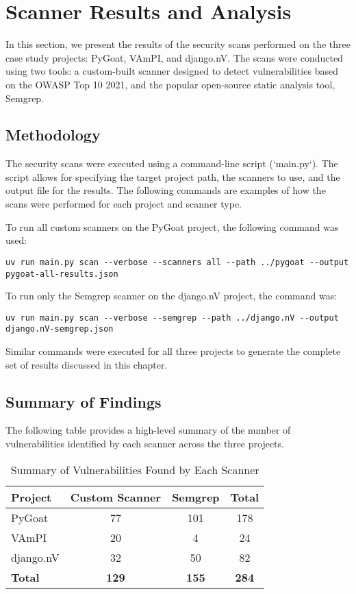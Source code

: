 
\section{Scanner Results and Analysis}
In this section, we present the results of the security scans performed on the three case study projects: PyGoat, VAmPI, and django.nV. The scans were conducted using two tools: a custom-built scanner designed to detect vulnerabilities based on the OWASP Top 10 2021, and the popular open-source static analysis tool, Semgrep.

\subsection{Methodology}

The security scans were executed using a command-line script (`main.py`). The script allows for specifying the target project path, the scanners to use, and the output file for the results. The following commands are examples of how the scans were performed for each project and scanner type.

To run all custom scanners on the PyGoat project, the following command was used:
\begin{verbatim}
uv run main.py scan --verbose --scanners all --path ../pygoat --output pygoat-all-results.json
\end{verbatim}

To run only the Semgrep scanner on the django.nV project, the command was:
\begin{verbatim}
uv run main.py scan --verbose --semgrep --path ../django.nV --output django.nV-semgrep.json
\end{verbatim}

Similar commands were executed for all three projects to generate the complete set of results discussed in this chapter.

\subsection{Summary of Findings}

The following table provides a high-level summary of the number of vulnerabilities identified by each scanner across the three projects.

\begin{table}[h!]
\centering
\caption{Summary of Vulnerabilities Found by Each Scanner}
\label{tab:summary_findings}
\begin{tabular}{|l|c|c|c|}
\hline
\textbf{Project} & \textbf{Custom Scanner} & \textbf{Semgrep} & \textbf{Total} \\
\hline
PyGoat & 77 & 101 & 178 \\
\hline
VAmPI & 20 & 4 & 24 \\
\hline
django.nV & 32 & 50 & 82 \\
\hline
\textbf{Total} & \textbf{129} & \textbf{155} & \textbf{284} \\
\hline
\end{tabular}
\end{table}


